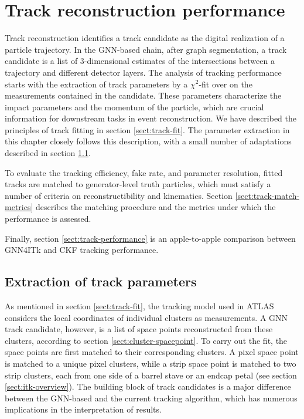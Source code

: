 \chapter{Track reconstruction performance}
\label{chap:tracking-performance}
Track reconstruction identifies a track candidate as the digital realization of a particle trajectory. 
In the GNN-based chain, after graph segmentation, a track candidate is a list of 3-dimensional estimates of the intersections between a trajectory and different detector layers. 
The analysis of tracking performance starts with the extraction of track parameters by a $\chi^2$-fit over on the measurements contained in the candidate.
These parameters characterize the impact parameters and the momentum of the particle, which are crucial information for downstream tasks in event reconstruction. 
We have described the principles of track fitting in section \ref{sect:track-fit}.
The parameter extraction in this chapter closely follows this description, with a small number of adaptations described in section \ref{sect:chi2-fit}.

To evaluate the tracking efficiency, fake rate, and parameter resolution, fitted tracks are matched to generator-level truth particles, which must satisfy a number of criteria on reconstructibility and kinematics.
Section \ref{sect:track-match-metrics} describes the matching procedure and the metrics under which the performance is assessed.

Finally, section \ref{sect:track-performance} is an apple-to-apple comparison between GNN4ITk and CKF tracking performance.



\section{Extraction of track parameters}
\label{sect:chi2-fit}

As mentioned in section \ref{sect:track-fit}, the tracking model used in ATLAS considers the local coordinates of individual clusters as measurements.
A GNN track candidate, however, is a list of space points reconstructed from these clusters, according to section \ref{sect:cluster-spacepoint}. 
To carry out the fit, the space points are first matched to their corresponding clusters. 
A pixel space point is matched to a unique pixel clusters, while a strip space point is matched to two strip clusters, each from one side of a barrel stave or an endcap petal (see section \ref{sect:itk-overview}). 
The building block of track candidates is a major difference between the GNN-based and the current tracking algorithm, which has numerous implications in the interpretation of results.

